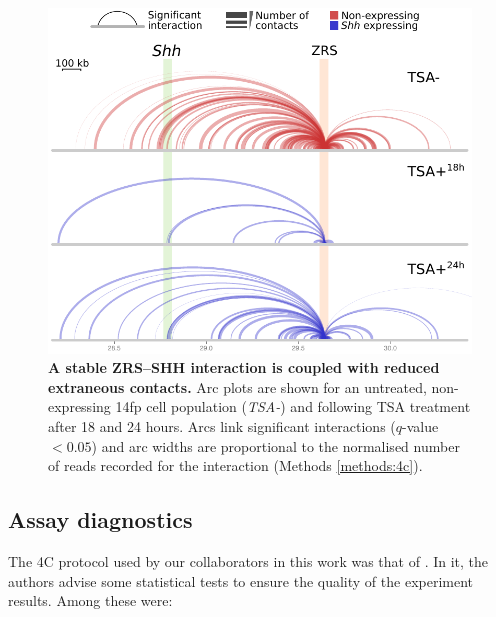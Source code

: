 \documentclass[a4paper,11pt,oneside]{book}
\begin{document}
\begin{figure}
\begin{center} 
\includegraphics[width=4.6in]{figs/4cArcs_v2.pdf}
\captionsetup{width=\textwidth} 
\caption[ A stable ZRS--SHH interaction is coupled with reduced extraneous contacts. ]{ {\bf A stable ZRS--SHH interaction is coupled with reduced extraneous contacts. }
Arc plots are shown for an untreated, non-expressing 14fp cell population (\emph{TSA-}) and following TSA treatment after 18 and 24 hours. Arcs link significant interactions ($q$-value $< 0.05$) and arc widths are proportional to the normalised number of reads recorded for the interaction (Methods \ref{methods:4c}).
}\label{fig:4carcs}
\end{center} 
\end{figure} 

%

\subsection{Assay diagnostics}


The 4C protocol used by our collaborators in this work was that of \citet{Stadhouders2013}. In it, the authors advise some statistical tests to ensure the quality of the experiment results. Among these were:\cite{Stadhouders2013}
\end{document}
